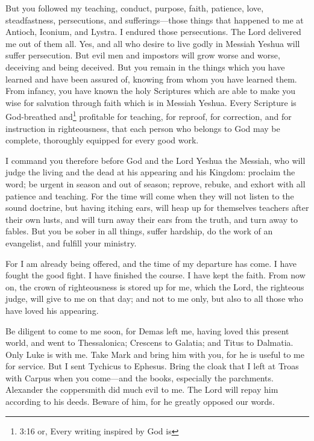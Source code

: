 \myverse{}But you followed my teaching, conduct, purpose, faith, patience, love, steadfastness, \myverse{}persecutions, and sufferings—those things that happened to me at Antioch, Iconium, and Lystra. I endured those persecutions. The Lord delivered me out of them all. \myverse{}Yes, and all who desire to live godly in Messiah Yeshua will suffer persecution. \myverse{}But evil men and impostors will grow worse and worse, deceiving and being deceived. \myverse{}But you remain in the things which you have learned and have been assured of, knowing from whom you have learned them. \myverse{}From infancy, you have known the holy Scriptures which are able to make you wise for salvation through faith which is in Messiah Yeshua. \myverse{}Every Scripture is God-breathed and\footnote{3:16 or, Every writing inspired by God is} profitable for teaching, for reproof, for correction, and for instruction in righteousness, \myverse{}that each person who belongs to God may be complete, thoroughly equipped for every good work.


\mychapter{} \myverse*{}I command you therefore before God and the Lord Yeshua the Messiah, who will judge the living and the dead at his appearing and his Kingdom: \myverse{}proclaim the word; be urgent in season and out of season; reprove, rebuke, and exhort with all patience and teaching. \myverse{}For the time will come when they will not listen to the sound doctrine, but having itching ears, will heap up for themselves teachers after their own lusts, \myverse{}and will turn away their ears from the truth, and turn away to fables. \myverse{}But you be sober in all things, suffer hardship, do the work of an evangelist, and fulfill your ministry.


\myverse{}For I am already being offered, and the time of my departure has come. \myverse{}I have fought the good fight. I have finished the course. I have kept the faith. \myverse{}From now on, the crown of righteousness is stored up for me, which the Lord, the righteous judge, will give to me on that day; and not to me only, but also to all those who have loved his appearing.


\myverse{}Be diligent to come to me soon, \myverse{}for Demas left me, having loved this present world, and went to Thessalonica; Crescens to Galatia; and Titus to Dalmatia. \myverse{}Only Luke is with me. Take Mark and bring him with you, for he is useful to me for service. \myverse{}But I sent Tychicus to Ephesus. \myverse{}Bring the cloak that I left at Troas with Carpus when you come—and the books, especially the parchments. \myverse{}Alexander the coppersmith did much evil to me. The Lord will repay him according to his deeds. \myverse{}Beware of him, for he greatly opposed our words.


